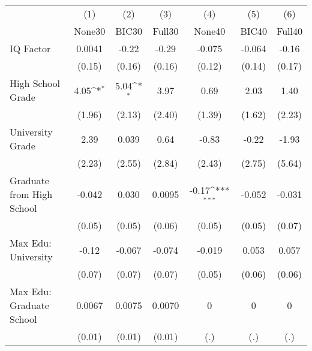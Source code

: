 {
\def\sym#1{\ifmmode^{#1}\else\(^{#1}\)\fi}
\begin{tabular}{l*{6}{c}}
\toprule
            &\multicolumn{1}{c}{(1)}&\multicolumn{1}{c}{(2)}&\multicolumn{1}{c}{(3)}&\multicolumn{1}{c}{(4)}&\multicolumn{1}{c}{(5)}&\multicolumn{1}{c}{(6)}\\
            &\multicolumn{1}{c}{None30}&\multicolumn{1}{c}{BIC30}&\multicolumn{1}{c}{Full30}&\multicolumn{1}{c}{None40}&\multicolumn{1}{c}{BIC40}&\multicolumn{1}{c}{Full40}\\
\midrule
IQ Factor   &      0.0041         &       -0.22         &       -0.29         &      -0.075         &      -0.064         &       -0.16         \\
            &      (0.15)         &      (0.16)         &      (0.16)         &      (0.12)         &      (0.14)         &      (0.17)         \\
\addlinespace
High School Grade&        4.05\sym{*}  &        5.04\sym{*}  &        3.97         &        0.69         &        2.03         &        1.40         \\
            &      (1.96)         &      (2.13)         &      (2.40)         &      (1.39)         &      (1.62)         &      (2.23)         \\
\addlinespace
University Grade&        2.39         &       0.039         &        0.64         &       -0.83         &       -0.22         &       -1.93         \\
            &      (2.23)         &      (2.55)         &      (2.84)         &      (2.43)         &      (2.75)         &      (5.64)         \\
\addlinespace
Graduate from High School&      -0.042         &       0.030         &      0.0095         &       -0.17\sym{***}&      -0.052         &      -0.031         \\
            &      (0.05)         &      (0.05)         &      (0.06)         &      (0.05)         &      (0.05)         &      (0.07)         \\
\addlinespace
Max Edu: University&       -0.12         &      -0.067         &      -0.074         &      -0.019         &       0.053         &       0.057         \\
            &      (0.07)         &      (0.07)         &      (0.07)         &      (0.05)         &      (0.06)         &      (0.06)         \\
\addlinespace
Max Edu: Graduate School&      0.0067         &      0.0075         &      0.0070         &           0         &           0         &           0         \\
            &      (0.01)         &      (0.01)         &      (0.01)         &         (.)         &         (.)         &         (.)         \\
\bottomrule
\end{tabular}
}
